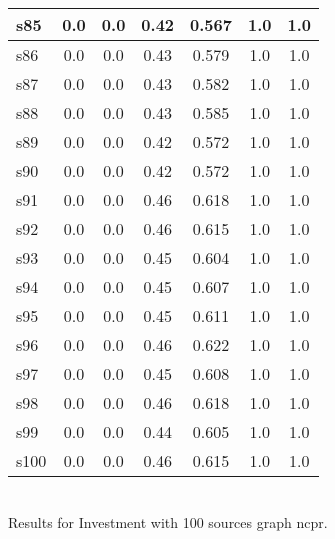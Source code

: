 \documentclass{article}
\begin{document}
\begin{tabular}{|l|c|c|c|c|c|c|}
\hline
s85 &0.0 & 0.0 & 0.42 & 0.567 & 1.0 & 1.0\\
\hline
s86 &0.0 & 0.0 & 0.43 & 0.579 & 1.0 & 1.0\\
\hline
s87 &0.0 & 0.0 & 0.43 & 0.582 & 1.0 & 1.0\\
\hline
s88 &0.0 & 0.0 & 0.43 & 0.585 & 1.0 & 1.0\\
\hline
s89 &0.0 & 0.0 & 0.42 & 0.572 & 1.0 & 1.0\\
\hline
s90 &0.0 & 0.0 & 0.42 & 0.572 & 1.0 & 1.0\\
\hline
s91 &0.0 & 0.0 & 0.46 & 0.618 & 1.0 & 1.0\\
\hline
s92 &0.0 & 0.0 & 0.46 & 0.615 & 1.0 & 1.0\\
\hline
s93 &0.0 & 0.0 & 0.45 & 0.604 & 1.0 & 1.0\\
\hline
s94 &0.0 & 0.0 & 0.45 & 0.607 & 1.0 & 1.0\\
\hline
s95 &0.0 & 0.0 & 0.45 & 0.611 & 1.0 & 1.0\\
\hline
s96 &0.0 & 0.0 & 0.46 & 0.622 & 1.0 & 1.0\\
\hline
s97 &0.0 & 0.0 & 0.45 & 0.608 & 1.0 & 1.0\\
\hline
s98 &0.0 & 0.0 & 0.46 & 0.618 & 1.0 & 1.0\\
\hline
s99 &0.0 & 0.0 & 0.44 & 0.605 & 1.0 & 1.0\\
\hline
s100 &0.0 & 0.0 & 0.46 & 0.615 & 1.0 & 1.0\\
\hline
\end{tabular}\\

\noindent Results for Investment with 100 sources graph ncpr.
\end{document}
